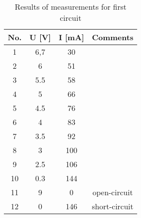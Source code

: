 \begin{table}[hptb]
	\centering
	\caption{Results of measurements for first circuit}
	\label{tab:tab1}
	\begin{tabular}{|c|c|c|c|}
		\hline
		No. & U [\unit{\volt}] & I [\unit{\milli\ampere}] & Comments \\
		\hline
		1& 6,7 & 30 &\\
		\hline
		2& 6 & 51 &\\
		\hline
		3& 5.5 & 58 &\\
		\hline
		4& 5 & 66 &\\
		\hline
        5& 4.5 & 76 &\\
		\hline
        6& 4 & 83 &\\
		\hline
        7& 3.5 & 92 &\\
		\hline
        8& 3 & 100 &\\
		\hline
        9& 2.5 & 106 &\\
		\hline
        10& 0.3 & 144 &\\
		\hline
        11& 9 & 0 & open-circuit\\
		\hline
        12& 0 & 146 & short-circuit\\
		\hline
	\end{tabular}
\end{table}